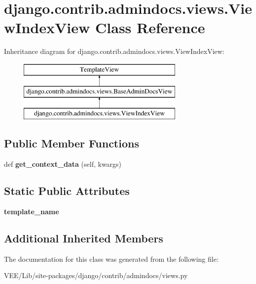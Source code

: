 \hypertarget{classdjango_1_1contrib_1_1admindocs_1_1views_1_1_view_index_view}{}\section{django.\+contrib.\+admindocs.\+views.\+View\+Index\+View Class Reference}
\label{classdjango_1_1contrib_1_1admindocs_1_1views_1_1_view_index_view}
Inheritance diagram for django.\+contrib.\+admindocs.\+views.\+View\+Index\+View\+:\begin{figure}[H]
\begin{center}
\leavevmode
\includegraphics[height=3.000000cm]{classdjango_1_1contrib_1_1admindocs_1_1views_1_1_view_index_view}
\end{center}
\end{figure}
\subsection*{Public Member Functions}
\begin{DoxyCompactItemize}
\item 
\mbox{\label{classdjango_1_1contrib_1_1admindocs_1_1views_1_1_view_index_view_a9d1b1268838609e9175f28694a31e92a}} 
def {\bfseries get\+\_\+context\+\_\+data} (self, kwargs)
\end{DoxyCompactItemize}
\subsection*{Static Public Attributes}
\begin{DoxyCompactItemize}
\item 
\mbox{\label{classdjango_1_1contrib_1_1admindocs_1_1views_1_1_view_index_view_aee942a5ae2dc4488f117ffef4824325f}} 
{\bfseries template\+\_\+name}
\end{DoxyCompactItemize}
\subsection*{Additional Inherited Members}


The documentation for this class was generated from the following file\+:\begin{DoxyCompactItemize}
\item 
V\+E\+E/\+Lib/site-\/packages/django/contrib/admindocs/views.\+py\end{DoxyCompactItemize}
